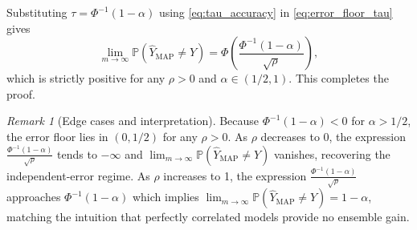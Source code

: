 \documentclass{article}
\theoremstyle{plain}
\theoremstyle{definition}
\theoremstyle{remark}
\newtheorem{remark}[theorem]{Remark}
\begin{document}
Substituting $\tau=\Phi^{-1}(1-\alpha)$ using \eqref{eq:tau_accuracy} in \eqref{eq:error_floor_tau} gives
\[
\lim_{m\to\infty}\mathbb{P}(\hat Y_{\mathrm{MAP}}\neq Y)
=\Phi\!\left(\frac{\Phi^{-1}(1-\alpha)}{\sqrt{\rho}}\right),
\]
which is strictly positive for any $\rho>0$ and $\alpha\in(1/2,1)$.
This completes the proof.


\begin{remark}[Edge cases and interpretation]
Because $\Phi^{-1}(1-\alpha)<0$ for $\alpha>1/2$, the error floor lies in $(0,1/2)$ for any $\rho>0$.
As $\rho$ decreases to 0, the expression $\frac{\Phi^{-1}(1-\alpha)}{\sqrt{\rho}}$ tends to $-\infty$ and $\lim_{m\to\infty}\mathbb{P}(\hat Y_{\mathrm{MAP}}\neq Y)
$ vanishes, recovering the
independent-error regime. As $\rho$ increases to 1, the expression $\frac{\Phi^{-1}(1-\alpha)}{\sqrt{\rho}}$ approaches $\Phi^{-1}(1-\alpha)$ which implies  $\lim_{m\to\infty}\mathbb{P}(\hat Y_{\mathrm{MAP}}\neq Y) =1-\alpha$,
matching the intuition that perfectly correlated models provide no ensemble gain.
\end{remark}





\newpage
\end{document}
